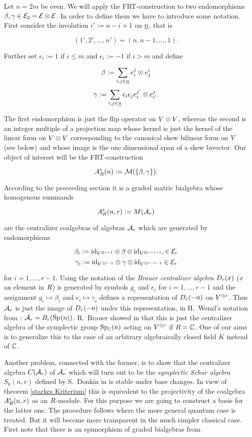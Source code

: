 \documentclass[twoside,12pt]{article}
\begin{document}
Let $n=2m$ be even. We will apply the FRT-construction to two 
endomorphisms $\beta, \gamma \in {\cal E}_{2}={\cal E}\otimes {\cal E}$. In order to define them we have to introduce some notation.
First consider the involution
$i':=n-i+1$ on $\underline{n}$, that is

\[ (1',2', \ldots , n')=(n,n-1, \ldots , 1). \]

Further set $\epsilon_i:=1$ if $i\leq m$ and $\epsilon_i:=-1$ if $i>m$
and define

\[ \beta :=\sum_{i,j\in \underline{n}}e_{i}^{ j} \otimes e_{j}^{ i} \]
\[\gamma :=\sum_{i,j\in \underline{n}} \epsilon_i \epsilon_j
e_{i}^{ j'} \otimes e_{i'}^{ j}.
\]

The first endomorphism is just the flip operator on $V
\otimes V$, whereas the second is an integer multiple of a projection
map whose kernel is just the kernel of the linear form on
$V \otimes V$ corresponding to the canonical skew bilinear form on
$V$ (see below) and whose image is the one dimensional span of a
skew bivector. Our object of interest will be the FRT-construction

\[ A^{{\rm s}}_{R}(n) :={\cal M}(\{\beta, \gamma\}). \]


According to the preceeding section it is a graded matric bialgebra
whose homogenous summands

\[ A^{{\rm s}}_{R}(n,r):=M({\cal A}_r) \]

are the centralizer coalgebras of algebras ${\cal A}_r$ which are generated by endomorphisms

\[ \beta_i := {\rm id}_{V^{\otimes i-1}} \otimes \beta
\otimes{\rm id}_{V^{\otimes r-i-1}},\in {\cal E}_r \]
\[ \gamma_i :={\rm id}_{V^{\otimes i-1}} \otimes \gamma  \otimes{\rm id}_{V^{\otimes r-i-1}}
\in {\cal E}_r \]

for $i=1, \ldots , r-1$. Using the notation of \cite{wenzl1} the
{\em Brauer centralizer algebra} $D_{r}({x})$ ($x$ an element in $R$)
is generated by symbols $g_i$ and $e_i$ for $i=1, \ldots, r-1$ and
the assignment $g_i\mapsto \beta_i$ and $e_i\mapsto \gamma_i$ defines
a representation of $D_{r}({-n})$ on $V^{\otimes r}$. Thus ${\cal A}_r$ is
just the image of $D_{r}({-n})$ under this representation, in
H.\ Wenzl's notation from \cite{wenzl1}: ${\cal A}_r=B_r({\rm Sp}_{}(n))$.
R.\ Brauer showed in \cite{brauer} that this is just the
centralizer algebra of the symplectic group ${\rm Sp}_{{\mathbb C}}(n)$
acting on $V^{\otimes r}$
if $R ={\mathbb C}$. One of our
aims is to generalize this to the case of an arbitrary algebraically
closed field $K$ instead of ${\mathbb C}$. \Ab

Another problem, connected with the former, is
to show that the centralizer algebra $C({\cal A}_r)$ 
of ${\cal A}_r$ which will turn out
to be the {\em symplectic Schur algebra} $S_0(n,r)$ defined by
S.\ Donkin in \cite{donk3} is stable under base changes. In view of
theorem \ref{starkes Kriterium} this is equivalent to the projectivity
of the coalgebra $A^{{\rm s}}_{R}(n,r)$ as an $R$-module. For this purpose
we are going to construct a basis for the latter one. 
The procedure follows \cite{doc}
where the more general quantum case is treated. But it will become more
transparent in the much simpler classical case. First note that there is an
epimorphism of graded bialgebras from
\end{document}
